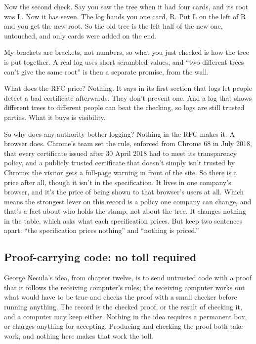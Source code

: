 \documentclass[11pt,twoside]{article}
\theoremstyle{thielethm}
\theoremstyle{thieledef}
\theoremstyle{thieledef}
\theoremstyle{thieledef}
\theoremstyle{thielethm}
\theoremstyle{thieleobs}
\theoremstyle{thielethm}
\begin{document}
Now the second check. Say you saw the tree when it had four cards, and its root was L. Now it has seven. The log hands you one card, R. Put L on the left of R and you get the new root. So the old tree is the left half of the new one, untouched, and only cards were added on the end.

My brackets are brackets, not numbers, so what you just checked is how the tree is put together. A real log uses short scrambled values, and ``two different trees can't give the same root'' is then a separate promise, from the wall.

What does the RFC price? Nothing. It says in its first section that logs let people detect a bad certificate afterwards. They don't prevent one. And a log that shows different trees to different people can beat the checking, so logs are still trusted parties. What it buys is visibility.

So why does any authority bother logging? Nothing in the RFC makes it. A browser does. Chrome's team set the rule, enforced from Chrome 68 in July 2018, that every certificate issued after 30 April 2018 had to meet its transparency policy, and a publicly trusted certificate that doesn't simply isn't trusted by Chrome: the visitor gets a full-page warning in front of the site. So there is a price after all, though it isn't in the specification. It lives in one company's browser, and it's the price of being shown to that browser's users at all. Which means the strongest lever on this record is a policy one company can change, and that's a fact about who holds the stamp, not about the tree. It changes nothing in the table, which asks what each specification prices. But keep two sentences apart: ``the specification prices nothing'' and ``nothing is priced.''

\subsection{Proof-carrying code: no toll required}

George Necula's idea, from chapter twelve, is to send untrusted code with a proof that it follows the receiving computer's rules; the receiving computer works out what would have to be true and checks the proof with a small checker before running anything. The record is the checked proof, or the result of checking it, and a computer may keep either. Nothing in the idea requires a permanent box, or charges anything for accepting. Producing and checking the proof both take work, and nothing here makes that work the toll.
\end{document}
